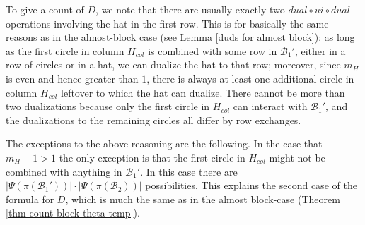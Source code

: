 \documentclass[11pt,letterpaper]{amsart}
\newcommand{\BB}{\mathcal{B}}
\numberwithin{equation}{section}
\begin{document}
To give a count of $D$, we note that there are usually exactly two $dual \circ ui \circ dual$ operations involving the hat in the first row. This is for basically the same reasons as in the almost-block case (see Lemma \ref{duds for almost block}): as long as the first circle in column $H_{col}$ is combined with some row in $\BB_1'$, either in a row of circles or in a hat, we can dualize the hat to that row; moreover, since $m_H$ is even and hence greater than $1$, there is always at least one additional circle in column $H_{col}$ leftover to which the hat can dualize. There cannot be more than two dualizations because only the first circle in $H_{col}$ can interact with $\BB_1'$, and the dualizations to the remaining circles all differ by row exchanges.

The exceptions to the above reasoning are the following. In the case that $m_H-1>1$ the only exception is that the first circle in $H_{col}$ might not be combined with anything in $\BB_1'$. In this case there are $|\Psi(\pi(\BB_1'))| \cdot |\Psi(\pi(\BB_2))|$ possibilities. This explains the second case of the formula for $D$, which is much the same as in the almost block-case (Theorem \ref{thm-count-block-theta-temp}).
\end{document}
